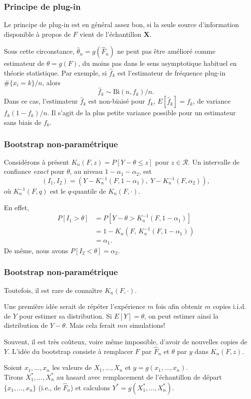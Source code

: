 \documentclass[t,usepdftitle=false]{beamer}
\def\bX{\boldsymbol{X}}
\def\RR{\mathcal{R}}
\def\iid{i.i.d.}
\begin{document}
\begin{frame}
\frametitle{Principe de plug-in}

Le principe de plug-in est en général assez bon, si la seule source d'information
disponible à propos de $F$ vient de l'échantillon $\bX$.

\mbox{}

Sous cette circonstance, $\hat{\theta}_n = g(\hat{F}_n)$ ne peut pas être
amélioré comme estimateur de $\theta = g(F)$, du moins pas dans le sens
asymptotique habituel en théorie statistique.
Par exemple, si $\hat{f}_k$ est l'estimateur de fréquence plug-in
$\#\lbrace x_i = k \rbrace/n$, alors
\[
\hat{f}_k \sim \mbox{Bi}(n, f_k)/n.
\]
Dans ce cas, l'estimateur $\hat{f}_k$ est non-biaisé pour $f_k$,
$E[\hat{f}_k] = f_k$, de variance $f_k(1-f_k)/n$.
Il s'agit de la plus petite variance possible pour un estimateur sans
biais de $f_k$.

\end{frame}

\begin{frame}
\frametitle{Bootstrap non-paramétrique}

Considérons à présent ${K_n(F, z)} = P[Y-\theta \le z]$ pour $z\in\RR$.
Un intervalle de confiance \emph{exact} pour $\theta$, au niveau
$1 - \alpha_1 - \alpha_2$, est
\[
  ({I_1}, {I_2}) =
  (Y - K_n^{-1}(F,1-\alpha_1),\; Y - K_n^{-1}(F,\alpha_2)),
\]
où $K_n^{-1}(F,q)$ est le $q$-quantile de $K_n(F,\cdot)$.

\mbox{}

En effet,
\begin{align*}
P[I_1 > \theta] 
&= P[Y - \theta > K_n^{-1}(F,1-\alpha_1)] \\
&= 1-K_n(F,\, K_n^{-1}(F,1-\alpha_1)) \\
&= \alpha_1.
\end{align*}
De même, nous avons $P[I_2 < \theta] = \alpha_2$.

\end{frame}

\begin{frame}
\frametitle{Bootstrap non-paramétrique}

Toutefois, il est rare de connaître $K_n(F,\cdot)$.

\mbox{}

Une première idée serait de répéter l'expérience $m$ fois afin obtenir
$m$ copies \iid{} de $Y$ pour estimer sa distribution.
Si $E[Y]=\theta$, on peut estimer ainsi la distribution de $Y-\theta$.
Mais cela ferait $mn$ simulations!

\mbox{}

Souvent, il est très coûteux, voire même impossible, d'avoir de nouvelles
copies de $Y$.
L'idée du bootstrap consiste à remplacer $F$ par $\hat{F}_n$ et
$\theta$ par $y$ dans $K_n(F,z)$.

\mbox{}

Soient ${x_1},\dots,{x_n}$ les valeurs de $X_1,\dots,X_n$ et 
${y} = g(x_1,\dots,x_n)$.\\
Tirons ${X_1^*},\dots,{X_n^*}$ au hasard avec remplacement de
l'échantillon de départ $\{x_1,\dots,x_n\}$ (i.e., de $\hat F_n$) et
calculons ${Y^*} = g(X_1^*,\dots,X_n^*)$.

\end{frame}
\end{document}
